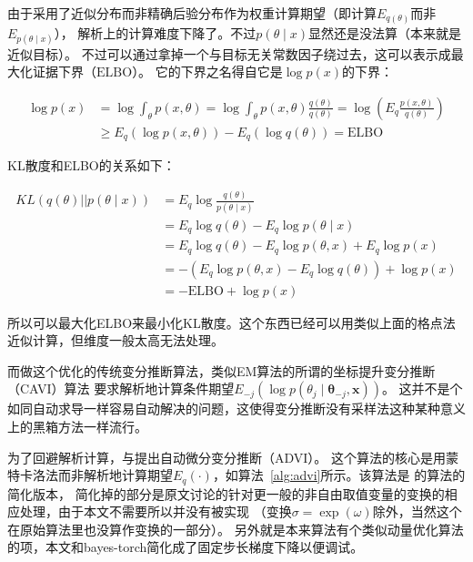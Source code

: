 \documentclass{sicnuthesis}
\begin{document}
由于采用了近似分布而非精确后验分布作为权重计算期望（即计算$E_{q(\theta)}$而非$E_{p(\theta \mid x)}$），
解析上的计算难度下降了。不过$p(\theta \mid x)$显然还是没法算（本来就是近似目标）。
不过可以通过拿掉一个与目标无关常数因子绕过去，这可以表示成最大化证据下界（$\mathrm{ELBO}$）。
它的下界之名得自它是$\log p(x)$的下界：

\begin{align*}
\log p(x) &= \log \int_\theta p(x,\theta) = \log \int_\theta p(x,\theta) \frac{q(\theta)}{q(\theta)} = \log \left( E_q \frac{p(x,\theta)}{q(\theta)} \right)  \\
          &\ge E_q (\log p(x,\theta)) - E_q(\log q(\theta)) = \mathrm{ELBO}
\end{align*}


KL散度和ELBO的关系如下：

\begin{align*}
KL(q(\theta) || p(\theta \mid x)) &= E_q \log \frac{q(\theta)}{p(\theta \mid x)}  \\
                                  &= E_q \log q(\theta) - E_q \log p(\theta \mid x) \\
                                  &= E_q \log q(\theta) - E_q \log p(\theta,x) + E_q \log p(x) \\
                                  &= -(E_q \log p(\theta,x) -E_q \log q(\theta)) + \log p(x) \\
                                  &= -\mathrm{ELBO} + \log p(x)
\end{align*}


所以可以最大化ELBO来最小化KL散度。这个东西已经可以用类似上面的格点法近似计算，但维度一般太高无法处理。

而做这个优化的传统变分推断算法，类似EM算法的所谓的坐标提升变分推断（CAVI）算法
要求解析地计算条件期望$E_{-j}(\log p(\theta_j \mid \mathbf{\theta}_{-j},\mathbf{x}))$。
这并不是个如同自动求导一样容易自动解决的问题，这使得变分推断没有采样法这种某种意义上的黑箱方法一样流行。

为了回避解析计算，\cite{kucukelbir2017automatic}与\cite{kucukelbir2014fully}提出自动微分变分推断（ADVI）。
这个算法的核心是用蒙特卡洛法而非解析地计算期望$E_q(\cdot)$，如算法~\ref{alg:advi}所示。该算法是
\cite{kucukelbir2017automatic}的算法的简化版本，
简化掉的部分是原文讨论的针对更一般的非自由取值变量的变换的相应处理，由于本文不需要所以并没有被实现
（变换$\sigma=\exp(\omega)$除外，当然这个在原始算法里也没算作变换的一部分）。
另外就是本来算法有个类似动量优化算法的项，本文和bayes-torch简化成了固定步长梯度下降以便调试。
\end{document}
